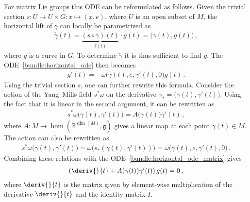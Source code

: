     \begin{example}
        For matrix Lie groups this ODE can be reformulated as follows. Given the trivial section $s:U\rightarrow U\times G:x\mapsto(x,e)$, where $U$ is an open subset of $M$, the horizontal lift of $\gamma$ can locally be parametrized as
        \begin{gather}
            \widetilde{\gamma}(t) = \underbrace{(s\circ\gamma)(t)}_{\delta(t)}\cdot g(t) = \bigl(\gamma(t),g(t)\bigr)\,,
        \end{gather}
        where $g$ is a curve in $G$. To determine $\widetilde{\gamma}$ it is thus sufficient to find $g$. The ODE~\eqref{bundle:horizontal_ode} then becomes
        \begin{gather}
            \label{bundle:horizontal_ode_matrix}
            g'(t) = -\omega\bigl(\gamma(t),e,\gamma'(t),0\bigr)g(t)\,.
        \end{gather}
        Using the trivial section $s$, one can further rewrite this formula. Consider the action of the Yang--Mills field $s^*\omega$ on the derivative $\gamma_*=\bigl(\gamma(t),\gamma'(t)\bigr)$. Using the fact that it is linear in the second argument, it can be rewritten as
        \begin{gather}
            s^*\omega\bigl(\gamma(t),\gamma'(t)\bigr) = A\bigl(\gamma(t)\bigr)\gamma'(t)\,,
        \end{gather}
        where $A:M\rightarrow\hom(\mathbb{R}^{\dim(M)},\mathfrak{g})$ gives a linear map at each point $\gamma(t)\in M$. The action can also be rewritten as
        \begin{gather}
            s^*\omega\bigl(\gamma(t),\gamma'(t)\bigr) = \omega\bigl(s_\ast(\gamma(t),\gamma'(t))\bigr) = \omega\bigl(\gamma(t),e,\gamma'(t),0\bigr)\,.
        \end{gather}
        Combining these relations with the ODE~\eqref{bundle:horizontal_ode_matrix} gives
        \begin{gather}
            \label{bundle:horizontal_ode_derivative}
            \left(\deriv{}{t} + A(\gamma(t))\gamma'(t)\right)g(t) = 0\,,
        \end{gather}
        where $\deriv{}{t}$ is the matrix given by element-wise multiplication of the derivative $\deriv{}{t}$ and the identity matrix $I$.


\end{example}
